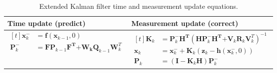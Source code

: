 \documentclass[12pt]{article}
\begin{document}
\begin{table}[h]
	\renewcommand{\arraystretch}{1.5}
	\caption{Extended Kalman filter time and measurement update equations.}
	\centering
	\label{tab:table-EKF}
	\begin{tabular}{C{7cm}|C{7cm}}
		\hline
		Time update (predict) & Measurement update (correct) \\
		\hline
		$\begin{aligned}[t]
			\mathbf{x}_{k}^{-} &= \mathbf{f}( \mathbf{x}_{k - 1},0) \\
			\mathbf{P}_{k}^{-} &= \mathbf{F}\mathbf{P}_{k - 1}\mathbf{F}^{\mathbf{T}}\mathbf{+}\mathbf{W}_{\mathbf{k}}\mathbf{Q}_{k - 1}\mathbf{W}_{k}^{T}
		\end{aligned}$ &
		$\begin{aligned}[t]
			\mathbf{K}_{k} &= \mathbf{P}_{k}^{-}\mathbf{H}^{\mathbf{T}}( \mathbf{H}\mathbf{P}_{k}^{-}\mathbf{H}^{\mathbf{T}}\mathbf{+}\mathbf{V}_{k}\mathbf{R}_{k}\mathbf{V}_{k}^{T})^{- 1} \\
			\mathbf{x}_{k} &= \mathbf{x}_{k}^{-} + \mathbf{K}_{k}( \mathbf{z}_{k} - \mathbf{h}(\mathbf{x}_{k}^{-},0)) \\
			\mathbf{P}_{k} &= ( \mathbf{I} - \mathbf{K}_{k}\mathbf{H})\mathbf{P}_{k}^{-}
		\end{aligned}$ \\
		\hline
	\end{tabular}
\end{table}
\end{document}
